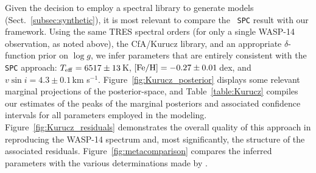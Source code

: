 \documentclass[iop,floatfix]{emulateapj}
\begin{document}
Given the decision to employ a spectral library to generate models
(Sect.~\ref{subsec:synthetic}), it is most relevant to compare the
\citeauthor{torres12}~{\tt SPC} result with our framework.  Using the same TRES
spectral orders (for only a single WASP-14 observation, as noted above), the
{\sc CfA/Kurucz} library, and an appropriate $\delta$-function prior on $\log
g$, we infer parameters that are entirely consistent with the {\tt SPC}
approach: $T_{\rm eff} = 6517\pm13$\,K, $[{\rm Fe/H}] = -0.27\pm0.01$\,dex, and
$v \sin i = 4.3\pm0.1$\,km s$^{-1}$.  Figure~\ref{fig:Kurucz_posterior}
displays some relevant marginal projections of the posterior-space, and
Table~\ref{table:Kurucz} compiles our estimates of the peaks of the marginal
posteriors and associated confidence intervals for all parameters employed in
the modeling.  Figure~\ref{fig:Kurucz_residuals} demonstrates the overall
quality of this approach in reproducing the WASP-14 spectrum and, most
significantly, the structure of the associated residuals.
Figure~\ref{fig:metacomparison} compares the inferred parameters with the
various determinations made by \citet{torres12}.  
\end{document}
